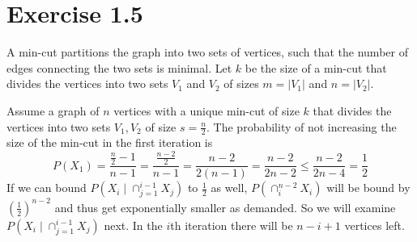 \documentclass[10pt,a4paper]{article}
\begin{document}
\section*{Exercise 1.5}

A min-cut partitions the graph into two sets of vertices, such that the number of edges connecting the two sets is minimal.
Let $k$ be the size of a min-cut that divides the vertices into two sets $V_{1}$ and $V_{2}$ of sizes $m = |V_{1}|$ and $n = |V_{2}|$.

Assume a graph of $n$ vertices with a unique min-cut of size $k$ that divides the vertices into two sets $V_{1}, V_{2}$ of size $s = \frac{n}{2}$.
The probability of not increasing the size of the min-cut in the first iteration is
\begin{equation*}
  P(X_{1}) = \frac{\frac{n}{2} - 1}{n - 1} = \frac{\frac{n - 2}{2}}{n - 1} = \frac{n - 2}{2(n - 1)} = \frac{n - 2}{2n - 2} \le \frac{n - 2}{2n - 4} = \frac{1}{2}
\end{equation*}
If we can bound $P(X_{i} \mid \cap_{j = 1}^{i - 1} X_{j})$ to $\frac{1}{2}$ as well, $P(\cap_{i}^{n - 2} X_{i})$ will be bound by $\left( \frac{1}{2} \right)^{n - 2}$ and thus get exponentially smaller as demanded.
So we will examine $P(X_{i} \mid \cap_{j = 1}^{i - 1} X_{j})$ next.
In the $i$th iteration there will be $n - i + 1$ vertices left.
\end{document}

